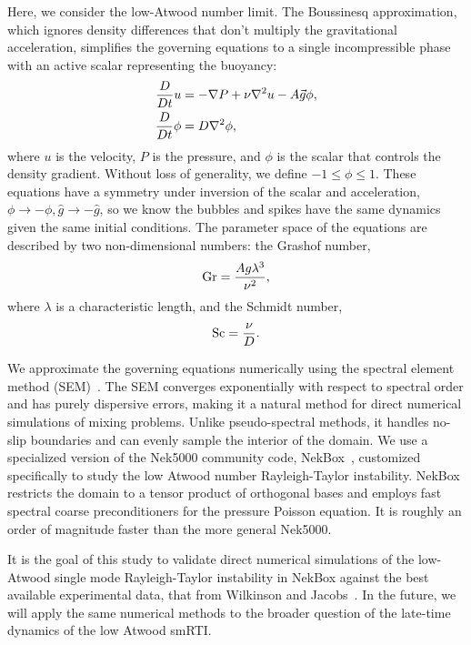 Here, we consider the low-Atwood number limit.
The Boussinesq approximation, which ignores density differences that don't multiply the gravitational acceleration, simplifies the governing equations to a single incompressible phase with an active scalar representing the buoyancy:
\begin{align} \elabel{boussinesq}
\frac{D}{D t} u &= - \nabla P + \nu \nabla^2 u - A \vec{g} \phi, \\
\frac{D}{Dt} \phi &= D \nabla^2 \phi, \nonumber
\end{align}
where $u$ is the velocity,
$P$ is the pressure, and 
$\phi$ is the scalar that controls the density gradient.
Without loss of generality, we define $-1 \le \phi \le 1$.
These equations have a symmetry under inversion of the scalar and acceleration, $\phi \rightarrow -\phi, \hat{g} \rightarrow -\hat{g}$, so we know the bubbles and spikes have the same dynamics given the same initial conditions.
The parameter space of the equations are described by two non-dimensional numbers: the Grashof number,
\begin{equation} \elabel{grashof}
\text{Gr} = \frac{A g \lambda^3}{\nu^2},
\end{equation}
where $\lambda$ is a characteristic length, and
the Schmidt number,
\begin{equation} \elabel{schmidt}
\text{Sc} = \frac{\nu}{D}.
\end{equation}

We approximate the governing equations numerically using the spectral element method (SEM)~\cite{Deville2002}.
The SEM converges exponentially with respect to spectral order and has purely dispersive errors, making it a natural method for direct numerical simulations of mixing problems.
Unlike pseudo-spectral methods, it handles no-slip boundaries and can evenly sample the interior of the domain.
We use a specialized version of the Nek5000 community code, NekBox~\cite{NekBox2}, customized specifically to study the low Atwood number Rayleigh-Taylor instability.
NekBox restricts the domain to a tensor product of orthogonal bases and employs fast spectral coarse preconditioners for the pressure Poisson equation.
It is roughly an order of magnitude faster than the more general Nek5000.

It is the goal of this study to validate direct numerical simulations of the low-Atwood single mode Rayleigh-Taylor instability in NekBox against the best available experimental data, that from Wilkinson and Jacobs~\cite{Wilkinson2007}.
In the future, we will apply the same numerical methods to the broader question of the late-time dynamics of the low Atwood smRTI.

